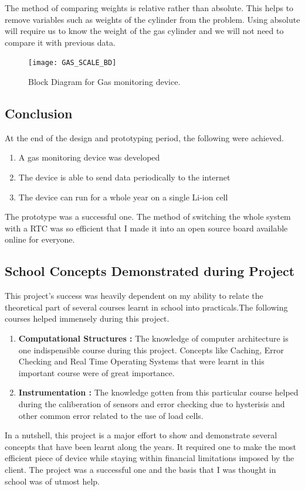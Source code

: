 The method of comparing weights is relative rather than absolute. This helps to remove variables such as weights of the cylinder from the problem. Using absolute will require us to know the weight of the gas cylinder and we will not need to compare it with previous data. 

\begin{figure}[p]
\texttt{[image: GAS\_SCALE\_BD]}
\centering
\caption{Block Diagram for Gas monitoring device.}
\centering
\label{fig:GAS_SCALE_BD}
\end{figure}

\subsection{Conclusion}
At the end of the design and prototyping period, the following were achieved.
\begin{enumerate}
\item A gas monitoring device was developed
\item The device is able to send data periodically to the internet
\item The device can run for a whole year on a single Li-ion cell
\end{enumerate}
The prototype was a successful one. The method of switching the whole system with a RTC was so efficient that I made it into an open source board available online for everyone. 


\subsection{School Concepts Demonstrated during Project}
This project's success was heavily dependent on my ability to relate the theoretical part of several courses learnt in school into practicals.The following courses helped immensely during this project.
\begin{enumerate}
\item \textbf{Computational Structures :} The knowledge of computer architecture is one indispensible course during this project. Concepts like Caching, Error Checking and Real Time Operating Systems that were learnt in this important course were of great importance.
\item \textbf{Instrumentation :} The knowledge gotten from this particular course helped during the caliberation of sensors and error checking due to hysterisis and other common error related to the use of load cells. 
\end{enumerate}
In a nutshell, this project is a major effort to show and demonstrate several concepts that have been learnt along the years. It required one to make the most efficient piece of device while staying within financial limitations imposed by the client. The project was a successful one and the basis that I was thought in school was of utmost help.





